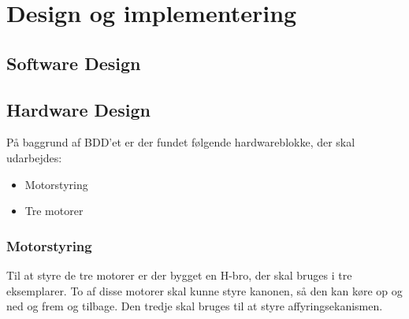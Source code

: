 \chapter{Design og implementering}


\section{Software Design}


\section{Hardware Design}
På baggrund af BDD'et er der fundet følgende hardwareblokke, der skal udarbejdes: 
\begin{itemize}
	\item Motorstyring
	\item Tre motorer
\end{itemize}

\subsection{Motorstyring}
Til at styre de tre motorer er der bygget en H-bro, der skal bruges i tre eksemplarer. To af disse motorer skal kunne styre kanonen, så den kan køre op og ned og frem og tilbage. Den tredje skal bruges til at styre affyringsekanismen. 

